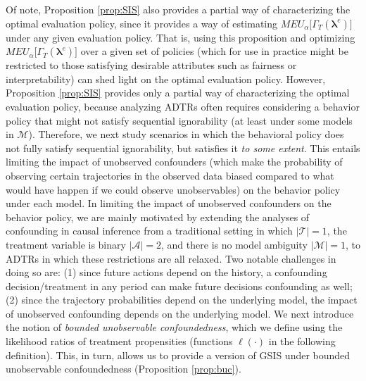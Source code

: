 \documentclass[opre,nonblindrev]{informs2}%
\newcommand{\1}{\hbox{\rm 1\kern-.35em 1}}
\newcommand{\MA}{\mathscr A}
\newcommand{\MT}{\mathscr T}
\newcommand{\MM}{\mathscr M}
\newcommand{\blambda}{\boldsymbol{\lambda}}
\begin{document}
Of note, Proposition \ref{prop:SIS} also provides a partial way of characterizing the optimal evaluation policy, since it provides a way of estimating $MEU_\alpha\big[\Gamma_T(\blambda^e)\big]$ under any given evaluation policy.  That is, using this proposition and optimizing $MEU_\alpha\big[\Gamma_T(\blambda^e)\big]$ over a given set of policies (which for use in practice might be restricted to those satisfying desirable attributes such as fairness or interpretability) can shed light on the optimal evaluation policy. However, Proposition \ref{prop:SIS} provides only a partial way of characterizing the optimal evaluation policy, because  analyzing ADTRs often requires considering a behavior policy that might not satisfy sequential ignorability (at least under some models in $\MM$).  Therefore, we next study scenarios in which the behavioral policy does not fully satisfy sequential ignorability, but satisfies it {\em to some extent}. This entails limiting the impact of unobserved confounders (which make the probability of observing certain trajectories in the observed data biased compared to what would have happen if we could observe unobservables)  on the behavior policy under each model. In limiting the impact of unobserved confounders on the behavior policy, we are mainly motivated by extending the analyses of confounding in causal inference \citep[see, e.g.,][]{Rosenbaum2002} from a traditional  setting in which  $|\MT|=1$, the treatment variable is binary $|\MA|=2$, and there is no model ambiguity $|\MM|=1$, to ADTRs in which these restrictions are all relaxed. Two notable challenges in doing so are: (1) since future actions depend on the history, a confounding decision/treatment in any period can make future decisions confounding as well; (2)   since the trajectory probabilities depend on the underlying model, the impact of unobserved confounding depends on the underlying model. We next introduce the notion of {\em bounded unobservable confoundedness}, which we define using the likelihood ratios of treatment propensities (functions $\ell (\cdot)$ in the following definition). This, in turn, allows us to provide a version of GSIS under bounded unobservable confoundedness (Proposition \ref{prop:buc}).
\end{document}
